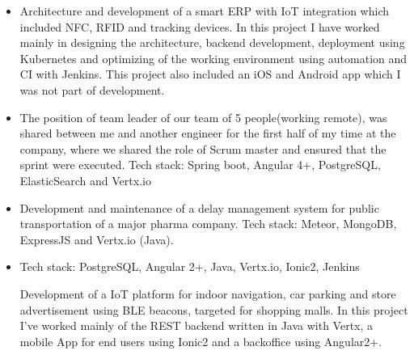 \documentclass[10pt,a4paper]{altacv}
\begin{document}

\begin{fullwidth}
\makecvheader
\end{fullwidth}


\begin{itemize}
\justifying
\item Architecture and development of a smart ERP with IoT integration which included NFC, RFID and tracking devices. In this project I have worked mainly in designing the architecture, backend development, deployment using Kubernetes and optimizing of the working environment using automation and CI with Jenkins. This project also included an iOS and Android app which I was not part of development.
\item The position of team leader of our team of 5 people(working remote), was shared between me and another engineer for the first half of my time at the company, where we shared the role of Scrum master and ensured that the sprint were executed.
  Tech stack: Spring boot, Angular 4+, PostgreSQL, ElasticSearch and Vertx.io
\item Development and maintenance of a delay management system for public
  transportation of a major pharma company. Tech stack: Meteor, MongoDB,
  ExpressJS and Vertx.io (Java).  
\end{itemize}

\divider

\begin{itemize}
\justifying
\item Tech stack: PostgreSQL, Angular 2+, Java, Vertx.io, Ionic2, Jenkins
  
Development of a IoT platform for indoor navigation, car parking and store advertisement using BLE beacons, targeted for shopping malls.
In this project I've worked mainly of the REST backend written in Java with Vertx, a mobile App for end users using Ionic2 and a backoffice using Angular2+.  
\end{itemize}
\end{document}
